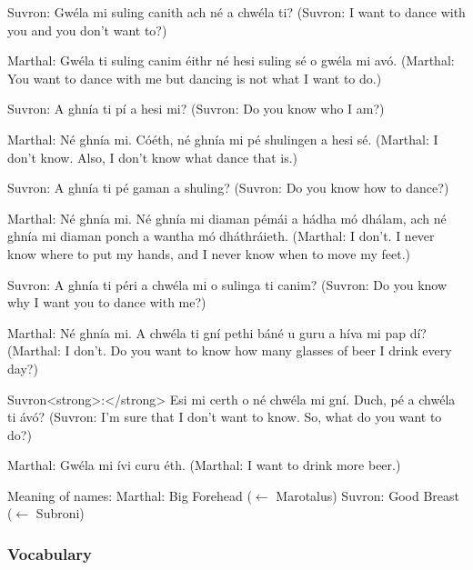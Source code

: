 Suvron: Gw\'{e}la mi suling canith ach n\'{e} a chw\'{e}la ti?
(Suvron: I want to dance with you and you don't want to?)

Marthal: Gw\'{e}la ti suling canim \'{e}ithr n\'{e} hesi suling s\'{e} o gw\'{e}la mi av\'{o}.
(Marthal: You want to dance with me but dancing is not what I want to do.)

Suvron: A ghn\'{i}a ti p\'{i} a hesi mi?
(Suvron: Do you know who I am?)

Marthal: N\'{e} ghn\'{i}a mi. C\'{o}\'{e}th, n\'{e} ghn\'{i}a mi p\'{e} shulingen a hesi s\'{e}.
(Marthal: I don't know. Also, I don't know what dance that is.)

Suvron: A ghn\'{i}a ti p\'{e} gaman a shuling?
(Suvron: Do you know how to dance?)

Marthal: N\'{e} ghn\'{i}a mi. N\'{e} ghn\'{i}a mi diaman p\'{e}m\'{a}i a h\'{a}dha m\'{o} dh\'{a}lam, ach n\'{e} ghn\'{i}a mi diaman ponch a wantha m\'{o} dh\'{a}thr\'{a}ieth.
(Marthal: I don't. I never know where to put my hands, and I never know when to move my feet.)

Suvron: A ghn\'{i}a ti p\'{e}ri a chw\'{e}la mi o sulinga ti canim?
(Suvron: Do you know why I want you to dance with me?)

Marthal: N\'{e} ghn\'{i}a mi. A chw\'{e}la ti gn\'{i} pethi b\'{a}n\'{e} u guru a h\'{i}va mi pap d\'{i}?
(Marthal: I don't. Do you want to know how many glasses of beer I drink every day?)

Suvron<strong>:</strong> Esi mi certh o n\'{e} chw\'{e}la mi gn\'{i}. Duch, p\'{e} a chw\'{e}la ti \'{a}v\'{o}?
(Suvron: I'm sure that I don't want to know. So, what do you want to do?)

Marthal: Gw\'{e}la mi \'{i}vi curu \'{e}th.
(Marthal: I want to drink more beer.)

Meaning of names:
Marthal: Big Forehead ($\leftarrow$ Marotalus)
Suvron: Good Breast ($\leftarrow$ Subroni)

\subsubsection{Vocabulary}

